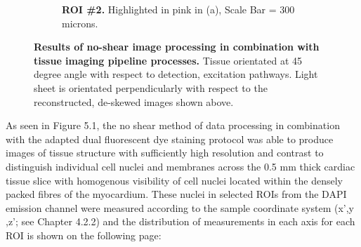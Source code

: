 \begin{figure}[H]
\begin{subfigure}[t]{0.475\textwidth}
\caption{\textbf{ROI \#2.} Highlighted in pink in (a), Scale Bar = 300 microns.}
\end{subfigure}
\caption{\textbf{Results of no-shear image processing in combination with tissue imaging pipeline processes.} Tissue orientated at 45 degree angle with respect to detection, excitation pathways. Light sheet is orientated perpendicularly with respect to the reconstructed, de-skewed images shown above.}
\end{figure}

As seen in Figure 5.1, the no shear method of data processing in combination with the adapted dual fluorescent dye staining protocol was able to produce images of tissue structure with sufficiently high resolution and contrast to distinguish individual cell nuclei and membranes across the 0.5 mm thick cardiac tissue slice with homogenous visibility of cell nuclei located within the densely packed fibres of the myocardium. These nuclei in selected ROIs from the DAPI emission channel were measured according to the sample coordinate system (x',y ,z'; see Chapter 4.2.2) and the distribution of measurements in each axis for each ROI is shown on the following page:

